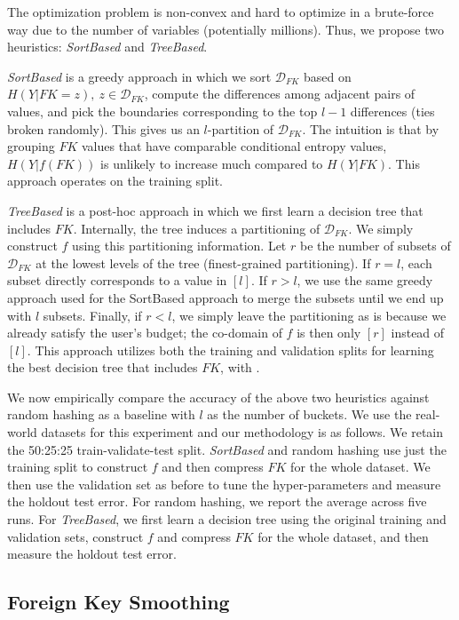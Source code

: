\documentclass[sigconf]{acmart}
\begin{document}
The optimization problem is non-convex and hard to optimize in a brute-force  way due to the number of variables (potentially millions). Thus, we propose two heuristics: \textit{SortBased} and \textit{TreeBased}.

\textit{SortBased} is a greedy approach in which we sort $\mathcal{D}_{FK}$ based on $H(Y|FK=z), ~z \in \mathcal{D}_{FK}$, compute the differences among adjacent pairs of values, and pick the boundaries corresponding to the top $l-1$ differences (ties broken randomly). This gives us an $l$-partition of $\mathcal{D}_{FK}$. The intuition is that by grouping $FK$ values that have comparable conditional entropy values, $H(Y|f(FK))$ is unlikely to increase much compared to $H(Y|FK)$. This approach operates on the training split.

\textit{TreeBased} is a post-hoc approach in which we first learn a decision tree that includes $FK$. Internally, the tree induces a partitioning of 
$\mathcal{D}_{FK}$. We simply construct $f$ using this partitioning information. Let $r$ be the number of subsets of $\mathcal{D}_{FK}$ at the lowest levels of the tree 
(finest-grained partitioning). If $r = l$, each subset directly corresponds to a value in $[l]$. If $r > l$, we use the same greedy approach used for the SortBased 
approach to merge the subsets until we end up with $l$ subsets. Finally, if $r < l$, we simply leave the partitioning as is because we already satisfy the user's budget;
the co-domain of $f$ is then only $[r]$ instead of $[l]$. This approach utilizes both the training and validation splits for learning the best decision tree that includes $FK$, with .

We now empirically compare the accuracy of the above two heuristics against random hashing as a baseline with $l$ as the number of buckets. 
We use the real-world datasets for this experiment and our methodology is as follows. We retain the 50:25:25 train-validate-test split.
\textit{SortBased} and random hashing use just the training split to construct $f$ and then compress $FK$ for the whole dataset. We then use
the validation set as before to tune the hyper-parameters and measure the holdout test error. For random hashing, we report the average across 
five runs. For \textit{TreeBased}, we first learn a decision tree using the original training and validation sets, construct $f$ and compress 
$FK$ for the whole dataset, and then measure the holdout test error.


\subsection{Foreign Key Smoothing}
\end{document}
